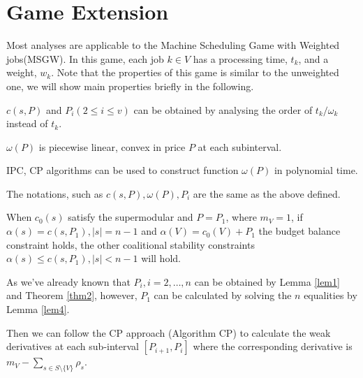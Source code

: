 \section{Game Extension}

Most analyses are applicable to the Machine Scheduling Game with Weighted jobs(MSGW).
In this game, each job $k \in V$ has a processing time, $t_k$, and a weight, $w_k$.
Note that the properties of this game is similar to the unweighted one, we will show main properties briefly in the following.

\begin{corollary} \label{cor-1}
$c(s,P)$ and $P_i(2 \leq i \leq v)$ can be obtained by analysing the order of $t_k/\omega_k$ instead of $t_k$.

\end{corollary}

\begin{corollary} \label{cor-2}
  $\omega(P)$ is piecewise linear, convex in price $P$ at each subinterval.
\end{corollary}

\begin{corollary} \label{cor-3}
  IPC, CP algorithms can be used to construct function $\omega(P)$ in polynomial time.
\end{corollary}

The notations, such as $c(s,P), \omega(P), P_i$ are the same as the above defined.

\begin{lem}\label{lem4}
When $c_0(s)$ satisfy the supermodular and $P=P_1$, where $m_V=1$, if $\alpha(s)=c(s, P_1), \left| s \right|= n-1$ and $\alpha(V)=c_0(V)+P_1$ the budget balance constraint holds, the other coalitional stability constraints $\alpha(s) \leq c(s, P_1), \left| s \right| < n-1$ will hold.
\end{lem}

As we've already known that $P_i, i = 2,\ldots,n$ can be obtained by Lemma \ref{lem1} and Theorem \ref{thm2}, however, $P_1$ can be calculated by solving the $n$ equalities by Lemma \ref{lem4}.

Then we can follow the CP approach (Algorithm CP) to calculate the weak derivatives at each sub-interval $[P_{i+1},P_{i}]$ where the corresponding derivative is $m_V-\sum_{s\in S\setminus\{V\}} \rho_s$.

